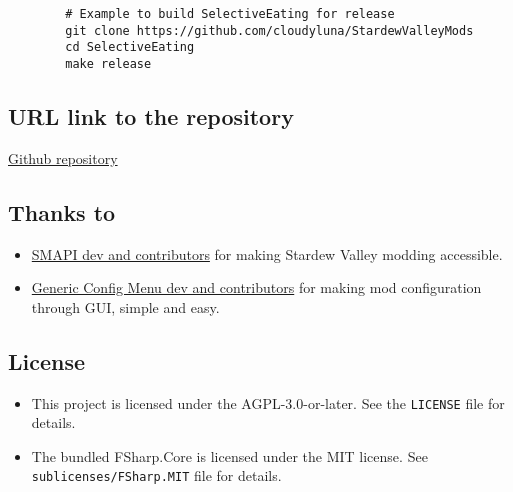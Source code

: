 \documentclass[a4paper,12pt]{article}
\begin{document}
	\begin{verbatim}
		# Example to build SelectiveEating for release
		git clone https://github.com/cloudyluna/StardewValleyMods
		cd SelectiveEating
		make release
	\end{verbatim}
	
	\subsection{URL link to the repository}
	\href{https://github.com/cloudyluna/StardewValleyMods/tree/main/SelectiveEating}{Github repository}
	
	\subsection{Thanks to}
	\begin{itemize}
		\item \href{https://github.com/Pathoschild/SMAPI}{SMAPI dev and contributors} for making Stardew Valley modding accessible.
		
		\item \href{https://www.nexusmods.com/stardewvalley/mods/5098}{Generic Config Menu dev and contributors} for making mod configuration through GUI, simple and easy.
	\end{itemize}
	
	\subsection{License}
	
	\begin{itemize}
		\item This project is licensed under the AGPL-3.0-or-later. See the \texttt{LICENSE} file for details.
		
		\item  The bundled FSharp.Core is licensed under the MIT license. See \texttt{sublicenses/FSharp.MIT} file for details.
	\end{itemize}
	
	
\end{document}

